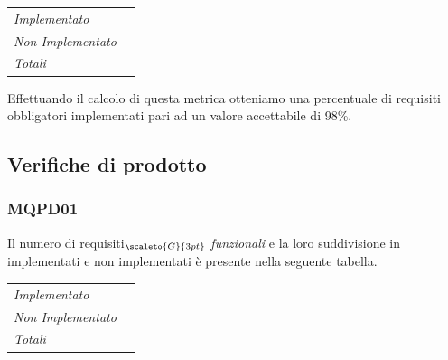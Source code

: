 {{{{\quad
\def\tabularxcolumn#1{m{#1}}
{
	\begin{center}
		\renewcommand{\arraystretch}{1.4}
		\begin{longtable}[c]{|p{4cm}|p{3cm}|}
			\hline
			\rowcolor{airforceblue}
			\makecell[c]{\textbf{Realizzazione}} & \makecell[c]{\textbf{Quantità}}\\
			\hline
			\textit{Implementato} & \makecell[c]{45}\\
			\hline
			\textit{Non Implementato} & \makecell[c]{1} \\
			\hline
			\textit{Totali} & \makecell[c]{46} \\
		\end{longtable}
		\captionof{table}{\textbf{PROI}}
	\end{center}

Effettuando il calcolo di questa metrica otteniamo una percentuale di requisiti obbligatori implementati pari ad un valore accettabile di 98\%.

\subsection{Verifiche di prodotto}\label{ResocontoAttivitàDiVerificaRevisioneDiQualificaVerificheDiProdotto}

\subsubsection{MQPD01}\label{ResocontoAttivitàDiVerificaRevisioneDiQualificaVerificheDiProcessoMQPD01}

Il numero di requisiti$_{\scaleto{G}{3pt}}$ \textit{funzionali} e la loro suddivisione in implementati e non implementati è presente nella seguente tabella.

\quad
\def\tabularxcolumn#1{m{#1}}
{
	\begin{center}
		\renewcommand{\arraystretch}{1.4}
		\begin{longtable}[c]{|p{4cm}|p{3cm}|}
			\hline
			\rowcolor{airforceblue}
			\makecell[c]{\textbf{Realizzazione}} & \makecell[c]{\textbf{Quantità}}\\
			\hline
			\textit{Implementato} & \makecell[c]{35}\\
			\hline
			\textit{Non Implementato} & \makecell[c]{22} \\
			\hline
			\textit{Totali} & \makecell[c]{57} \\
		\end{longtable}
	\end{center}

}}}}}}
